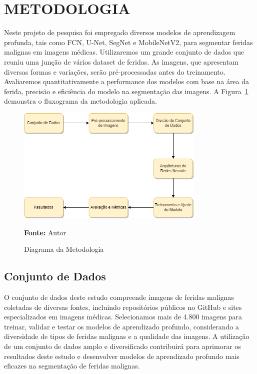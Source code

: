 \section{METODOLOGIA}
Neste projeto de pesquisa foi empregado diversos modelos de aprendizagem profunda, tais como \ac{FCN}, \ac{U-Net}, \ac{SegNet} e \ac{MobileNetV2}, para segmentar feridas malignas em imagens médicas. Utilizaremos um grande conjunto de dados que reuniu uma junção de vários dataset de feridas. As imagens, que apresentam diversas formas e variações, serão pré-processadas antes do treinamento. Avaliaremos quantitativamente a performance dos modelos com base na área da ferida, precisão e eficiência do modelo na segmentação das imagens. A Figura~\ref{fig:diagrama} demonstra o fluxograma da metodologia aplicada.

\begin{figure}[htbp]
    \centering
    \caption{Diagrama da Metodologia}
    \includegraphics[width=0.8\textwidth]{img/Diagrama.png}
    \label{fig:diagrama}
    \par\medskip\textbf{Fonte:} Autor
\end{figure}

\subsection{Conjunto de Dados}
    O conjunto de dados deste estudo compreende imagens de feridas malignas coletadas de diversas fontes, incluindo repositórios públicos no GitHub e sites especializados em imagens médicas. Selecionamos mais de 4.800 imagens para treinar, validar e testar os modelos de aprendizado profundo, considerando a diversidade de tipos de feridas malignas e a qualidade das imagens. A utilização de um conjunto de dados amplo e diversificado contribuirá para aprimorar os resultados deste estudo e desenvolver modelos de aprendizado profundo mais eficazes na segmentação de feridas malignas.
    
